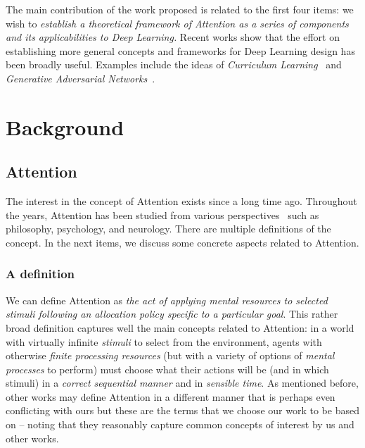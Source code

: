 \documentclass[12pt]{article}
\begin{document}
The main contribution of the work proposed is related to the first four items:
we wish to
\emph{establish a theoretical framework of Attention as a series of components
    and its applicabilities to Deep Learning.}
Recent works show that the effort on establishing more general concepts and frameworks for
Deep Learning design has been broadly useful.
Examples include the ideas of \emph{Curriculum Learning}~\cite{ref:curriculum}
and \emph{Generative Adversarial Networks}~\cite{ref:gans}.

\newpage
\section{Background}
\subsection{Attention}
\label{attention}
The interest in the concept of Attention exists since a long time ago.
Throughout the years, Attention has been studied
from various perspectives~\cite{ref:esther-thesis}
such as philosophy, psychology, and neurology.
There are multiple definitions of the concept.
In the next items, we discuss some concrete aspects related to Attention.

\subsubsection{A definition}
We can define Attention as
\emph{the act of applying mental resources to selected stimuli following an allocation policy specific to
    a particular goal}.
This rather broad definition captures well the main concepts related to Attention:
in a world with virtually infinite
\emph{stimuli} to select from the environment, agents with otherwise \emph{finite processing
resources} (but with a variety of options of \emph{mental processes} to perform) must choose what their
actions will be (and in which stimuli) in a \emph{correct sequential manner} and in \emph{sensible time}.
As mentioned before, other works may define Attention in a different manner
that is perhaps even conflicting with ours but
these are the terms that we choose our work to be based on -- noting that they
reasonably capture common concepts of interest by us and other works.~\cite{ref:helgason}
\end{document}
